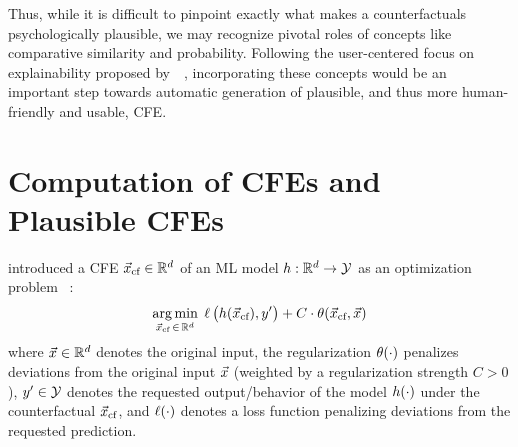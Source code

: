 Thus, while it is difficult to pinpoint exactly what makes a counterfactuals psychologically plausible, we may recognize pivotal roles of concepts like comparative similarity and probability.
Following the user-centered focus on explainability proposed by~\citeauthor{miller_explanation_2019}~\citep{miller_explanation_2019}, incorporating these concepts would be an important step towards automatic generation of plausible, and thus more human-friendly and usable, \gls{CFE}.

\section{Computation of CFEs and Plausible CFEs}\label{sec:EffCompCFs}
\citeauthor{wachter_counterfactual_2017} introduced a \gls{CFE} ${\vec{x}_{\text{cf}}}\in\mathbb{R}^d$ of an \gls{ML} model $h:\mathbb{R}^d\to\mathcal{Y}$ as an optimization problem~\citep{wachter_counterfactual_2017} :
\begin{equation}\label{eq:counterfactual_opt_original}
\underset{{\vec{x}_{\text{cf}}} \,\in\, \mathbb{R}^d}{\arg\min}\; \operatorname*{{\ell}}\big(h({\vec{x}_{\text{cf}}}), y'\big) + C \cdot \operatorname*{{\theta}}({\vec{x}_{\text{cf}}}, \vec{x})
\end{equation}
where $\vec{x}\in\mathbb{R}^d$ denotes the original input, the regularization $\operatorname*{{\theta}}(\cdot)$ penalizes deviations from the original input $\vec{x}$ (weighted by a regularization strength $C>0$), $y'\in\mathcal{Y}$ denotes the requested output/behavior of the model $h(\cdot)$ under the counterfactual ${\vec{x}_{\text{cf}}}$, and $\operatorname*{{\ell}}(\cdot)$ denotes a loss function penalizing deviations from the requested prediction.

